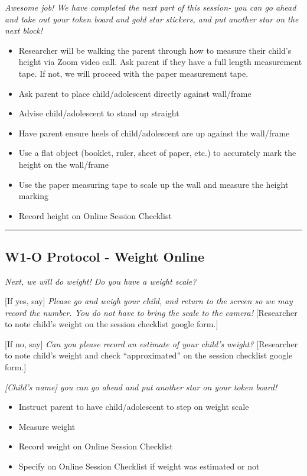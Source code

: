 \documentclass[
]{book}
\providecommand{\tightlist}{%
  \setlength{\itemsep}{0pt}\setlength{\parskip}{0pt}}
\begin{document}
\emph{Awesome job! We have completed the next part of this session- you can go ahead and take out your token board and gold star stickers, and put another star on the next block!}

\begin{itemize}
\tightlist
\item
  Researcher will be walking the parent through how to measure their child's height via Zoom video call. Ask parent if they have a full length measurement tape. If not, we will proceed with the paper measurement tape.
\item
  Ask parent to place child/adolescent directly against wall/frame
\item
  Advise child/adolescent to stand up straight
\item
  Have parent ensure heels of child/adolescent are up against the wall/frame
\item
  Use a flat object (booklet, ruler, sheet of paper, etc.) to accurately mark the height on the wall/frame
\item
  Use the paper measuring tape to scale up the wall and measure the height marking
\item
  Record height on Online Session Checklist
\end{itemize}

\begin{center}\rule{0.5\linewidth}{0.5pt}\end{center}

\hypertarget{w1-o-protocol---weight-online}{%
\subsection{W1-O Protocol - Weight Online}\label{w1-o-protocol---weight-online}}

\emph{Next, we will do weight! Do you have a weight scale?}

{[}If yes, say{]} \emph{Please go and weigh your child, and return to the screen so we may record the number. You do not have to bring the scale to the camera!} {[}Researcher to note child's weight on the session checklist google form.{]}

{[}If no, say{]} \emph{Can you please record an estimate of your child's weight?} {[}Researcher to note child's weight and check ``approximated'' on the session checklist google form.{]}

\emph{{[}Child's name{]} you can go ahead and put another star on your token board!}

\begin{itemize}
\tightlist
\item
  Instruct parent to have child/adolescent to step on weight scale
\item
  Measure weight
\item
  Record weight on Online Session Checklist
\item
  Specify on Online Session Checklist if weight was estimated or not
\end{itemize}
\end{document}
